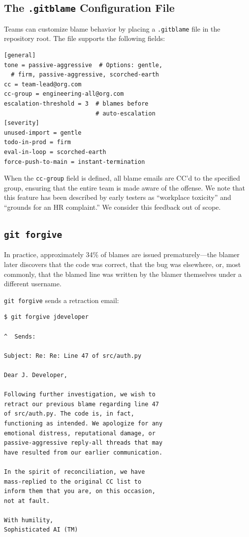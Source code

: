 \documentclass{sigtbd}
\begin{document}
\subsection{The \texttt{.gitblame} Configuration File}

Teams can customize blame behavior by placing a \texttt{.gitblame} file in the repository root. The file supports the following fields:

\begin{lstlisting}
[general]
tone = passive-aggressive  # Options: gentle,
  # firm, passive-aggressive, scorched-earth
cc = team-lead@org.com
cc-group = engineering-all@org.com
escalation-threshold = 3  # blames before
                          # auto-escalation
[severity]
unused-import = gentle
todo-in-prod = firm
eval-in-loop = scorched-earth
force-push-to-main = instant-termination
\end{lstlisting}

When the \texttt{cc-group} field is defined, all blame emails are CC'd to the specified group, ensuring that the entire team is made aware of the offense. We note that this feature has been described by early testers as ``workplace toxicity'' and ``grounds for an HR complaint.'' We consider this feedback out of scope.

\subsection{\texttt{git forgive}}

In practice, approximately 34\% of blames are issued prematurely---the blamer later discovers that the code was correct, that the bug was elsewhere, or, most commonly, that the blamed line was written by the blamer themselves under a different username.

\texttt{git forgive} sends a retraction email:

\begin{lstlisting}
$ git forgive jdeveloper

^  Sends:

Subject: Re: Re: Line 47 of src/auth.py

Dear J. Developer,

Following further investigation, we wish to
retract our previous blame regarding line 47
of src/auth.py. The code is, in fact,
functioning as intended. We apologize for any
emotional distress, reputational damage, or
passive-aggressive reply-all threads that may
have resulted from our earlier communication.

In the spirit of reconciliation, we have
mass-replied to the original CC list to
inform them that you are, on this occasion,
not at fault.

With humility,
Sophisticated AI (TM)
\end{lstlisting}
\end{document}
